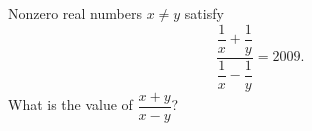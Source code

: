 Nonzero real numbers $x\ne y$ satisfy
\[
\dfrac{\dfrac{1}{x}+\dfrac{1}{y}}{\dfrac{1}{x}-\dfrac{1}{y}}=2009 .
\]
What is the value of $\dfrac{x+y}{x-y}$?
